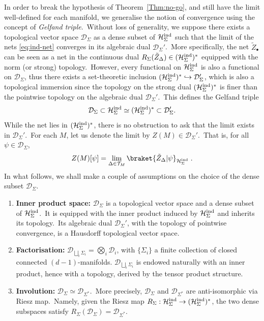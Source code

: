 \documentclass[11pt]{article}
\newcommand{\Hind}{\mathcal{H}_{\Sigma}^{\rm ind}}
\theoremstyle{definition}
\numberwithin{equation}{section}
\begin{document}
\noindent
In order to break the hypothesis of Theorem~\ref{Thm:no-go}, and still have the limit well-defined for each manifold, we generalise the notion of convergence using the concept of \emph{Gelfand triple}.~Without loss of generality, we suppose there exists a topological vector space $\mathcal{D}_{\Sigma}$ as a dense subset of $\mathcal{H}_{\Sigma}^{\rm ind}$ such that the limit of the nets \eqref{eq:ind-net} converges in its algebraic dual $\mathcal{D}_{\Sigma}'$.~More specifically, the net $\tilde{Z}_{\bullet}$ can be seen as a net in the continuous dual $R_{\Sigma}(\tilde{Z}_{\Delta})\in(\mathcal{H}_{\Sigma}^{\rm ind})^*$ equipped with the norm (or strong) topology.~However, every functional on $\mathcal{H}_{\Sigma}^{\rm ind}$ is also a functional on $\mathcal{D}_{\Sigma}$, thus there exists a set-theoretic inclusion $(\mathcal{H}_{\Sigma}^{\rm ind})^*\hookrightarrow\mathcal{D}_{\Sigma}'$, which is also a topological immersion since the topology on the strong dual $(\mathcal{H}_{\Sigma}^{\rm ind})^*$ is finer than the pointwise topology on the algebraic dual $\mathcal{D}_{\Sigma}'$.~This defines the Gelfand triple
\[\mathcal{D}_{\Sigma}\subset\Hind\simeq(\Hind)^*\subset\mathcal{D}'_{\Sigma}.\]
While the net lies in $(\mathcal{H}_{\Sigma}^{\rm ind})^*$, there is no obstruction to ask that the limit exists in $\mathcal{D}_{\Sigma}'$.~For each $M$, let us denote the limit by $Z(M)\in\mathcal{D}_{\Sigma}'$.~That is, for all $\psi\in\mathcal{D}_{\Sigma}$,
\begin{equation}
\label{dLim}
    Z(M)[\psi]=\lim_{\Delta\in\mathcal{T}_M}\braket{\tilde{Z}_{\Delta}|\psi}_{\mathcal H_{\Sigma}^{\rm ind}}\;.
\end{equation}
In what follows, we shall make a couple of assumptions on the choice of the dense subset $\mathcal D_\Sigma$.
\begin{enumerate}
    \item\label{Assumption1} \textbf{Inner product space:} $\mathcal{D}_{\Sigma}$ is a topological vector space and a dense subset of $\mathcal{H}_{\Sigma}^{\rm ind}$.~It is equipped with the inner product induced by $\mathcal{H}_{\Sigma}^{\rm ind}$ and inherits its topology.~Its algebraic dual $\mathcal{D}_{\Sigma}'$, with the topology of pointwise convergence, is a Hausdorff topological vector space.
    \item\label{Assumption2}\textbf{Factorisation:} $\mathcal{D}_{\bigsqcup_{i}\Sigma_i}=\bigotimes_i\mathcal{D}_i$, with $\{\Sigma_i\}$ a finite collection of closed connected $(d-1)$-manifolds. $\mathcal{D}_{\bigsqcup_{i}\Sigma_i}$ is endowed naturally with an inner product, hence with a topology, derived by the tensor product structure.
    \item\label{Assumption3}\textbf{Involution:} $\mathcal{D}_{\Sigma}\simeq\mathcal{D}_{\Sigma^*}$.~More precisely, $\mathcal{D}_{\Sigma}$ and $\mathcal{D}_{\Sigma^*}$ are anti-isomorphic via Riesz map.~Namely, given the Riesz map $R_{\Sigma}:\mathcal{H}_{\Sigma}^{\rm ind}\to(\mathcal{H}_{\Sigma}^{\rm ind})^*$, the two dense subspaces satisfy $R_{\Sigma}(\mathcal{D}_{\Sigma})=\mathcal{D}_{\Sigma^*}$.
\end{enumerate}
\end{document}
